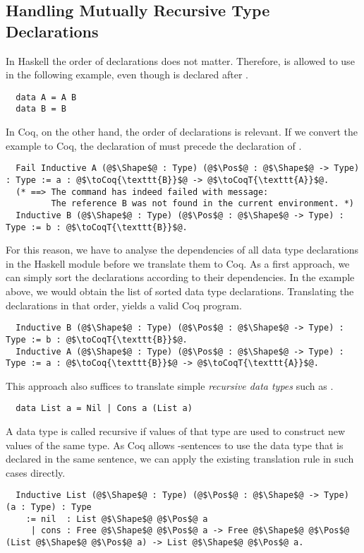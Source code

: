 \subsection{Handling Mutually Recursive Type Declarations} \label{sec:translation:type-decl:rec}
In Haskell the order of declarations does not matter.
Therefore,  is allowed to use  in the following example, even though  is declared after .
\begin{verbatim}
  data A = A B
  data B = B
\end{verbatim}
In Coq, on the other hand, the order of declarations is relevant.
If we convert the example to Coq, the declaration of  must precede the declaration of .
\begin{verbatim}
  Fail Inductive A (@$\Shape$@ : Type) (@$\Pos$@ : @$\Shape$@ -> Type) : Type := a : @$\toCoq{\texttt{B}}$@ -> @$\toCoqT{\texttt{A}}$@.
  (* ==> The command has indeed failed with message:
         The reference B was not found in the current environment. *)
  Inductive B (@$\Shape$@ : Type) (@$\Pos$@ : @$\Shape$@ -> Type) : Type := b : @$\toCoqT{\texttt{B}}$@.
\end{verbatim}
For this reason, we have to analyse the dependencies of all data type declarations in the Haskell module before we translate them to Coq.
As a first approach, we can simply sort the declarations according to their dependencies.
In the example above, we would obtain the list \haskell{[B, A]} of sorted data type declarations.
Translating the declarations in that order, yields a valid Coq program.
\begin{verbatim}
  Inductive B (@$\Shape$@ : Type) (@$\Pos$@ : @$\Shape$@ -> Type) : Type := b : @$\toCoqT{\texttt{B}}$@.
  Inductive A (@$\Shape$@ : Type) (@$\Pos$@ : @$\Shape$@ -> Type) : Type := a : @$\toCoq{\texttt{B}}$@ -> @$\toCoqT{\texttt{A}}$@.
\end{verbatim}

This approach also suffices to translate simple \textit{recursive data types} such as .
\begin{verbatim}
  data List a = Nil | Cons a (List a)
\end{verbatim}
A data type is called recursive if values of that type are used to construct new values of the same type.
As Coq allows -sentences to use the data type that is declared in the same sentence, we can apply the existing translation rule in such cases directly.
\begin{verbatim}
  Inductive List (@$\Shape$@ : Type) (@$\Pos$@ : @$\Shape$@ -> Type) (a : Type) : Type
    := nil  : List @$\Shape$@ @$\Pos$@ a
     | cons : Free @$\Shape$@ @$\Pos$@ a -> Free @$\Shape$@ @$\Pos$@ (List @$\Shape$@ @$\Pos$@ a) -> List @$\Shape$@ @$\Pos$@ a.
\end{verbatim}

